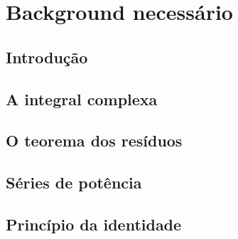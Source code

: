 \chapter{Background necessário}


\section{Introdução}

\cite{titchmarsh}

\section{A integral complexa}


\section{O teorema dos resíduos}


\section{Séries de potência}


\section{Princípio da identidade}